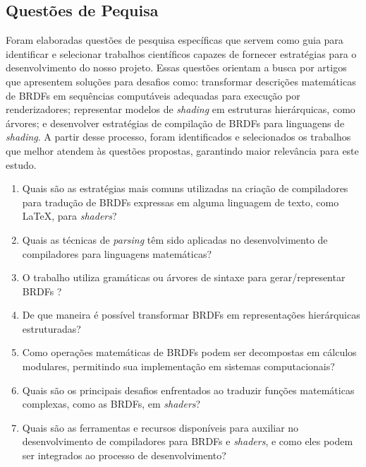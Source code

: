 %
%


%








\subsection{Questões de Pequisa}  \label{questoes-pesquisa}


Foram elaboradas questões de pesquisa específicas que servem como guia para identificar e selecionar trabalhos científicos capazes de fornecer estratégias para o desenvolvimento do nosso projeto. Essas questões orientam a busca por artigos que apresentem soluções para desafios como: transformar descrições matemáticas de BRDFs em sequências computáveis adequadas para execução por renderizadores; representar modelos de \textit{shading} em estruturas hierárquicas, como árvores; e desenvolver estratégias de compilação de BRDFs para linguagens de \textit{shading}. A partir desse processo, foram identificados e selecionados os trabalhos que melhor atendem às questões propostas, garantindo maior relevância para este estudo.


\begin{enumerate}
  \item Quais são as estratégias mais comuns utilizadas na criação de compiladores para tradução de BRDFs expressas em alguma linguagem de texto, como \LaTeX{}, para \textit{shaders}?

  \item Quais as técnicas de \textit{parsing} têm sido aplicadas no desenvolvimento de compiladores para linguagens matemáticas?

  \item O trabalho utiliza gramáticas ou árvores de sintaxe para gerar/representar BRDFs ?

  \item De que maneira é possível transformar BRDFs em representações hierárquicas estruturadas?

  \item Como operações matemáticas de BRDFs podem ser decompostas em cálculos modulares, permitindo sua implementação em sistemas computacionais?

 \item Quais são os principais desafios enfrentados ao traduzir funções matemáticas complexas, como as BRDFs, em \textit{shaders}?

 \item Quais são as ferramentas e recursos disponíveis para auxiliar no desenvolvimento de compiladores para BRDFs e \textit{shaders}, e como eles podem ser integrados ao processo de desenvolvimento?

\end{enumerate}




